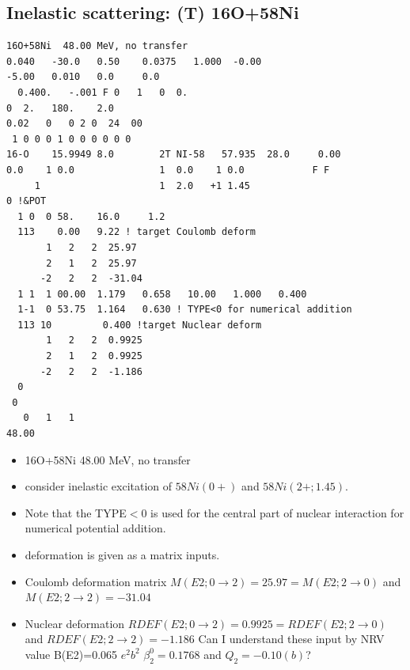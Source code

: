 \documentclass[11pt]{book}
\begin{document}
\subsection{Inelastic scattering: (T) 16O+58Ni}
\begin{small} 
\begin{lstlisting}[frame=single]
16O+58Ni  48.00 MeV, no transfer
0.040   -30.0   0.50    0.0375   1.000  -0.00
-5.00   0.010   0.0     0.0
  0.400.   -.001 F 0   1   0  0.
0  2.   180.    2.0
0.02   0   0 2 0  24  00
 1 0 0 0 1 0 0 0 0 0 0
16-O    15.9949 8.0        2T NI-58   57.935  28.0     0.00
0.0    1 0.0               1  0.0    1 0.0            F F
     1                     1  2.0   +1 1.45
0 !&POT
  1 0  0 58.    16.0     1.2
  113    0.00   9.22 ! target Coulomb deform
       1   2   2  25.97
       2   1   2  25.97
      -2   2   2  -31.04
  1 1  1 00.00  1.179   0.658   10.00   1.000   0.400
  1-1  0 53.75  1.164   0.630 ! TYPE<0 for numerical addition
  113 10         0.400 !target Nuclear deform
       1   2   2  0.9925
       2   1   2  0.9925
      -2   2   2  -1.186
  0
 0
   0   1   1
48.00
\end{lstlisting}
\end{small} 
\begin{itemize}
\item 16O+58Ni  48.00 MeV, no transfer
\item consider inelastic excitation of 
      $58Ni(0+)$ and  $58Ni(2+;1.45)$.
\item Note that the TYPE$<$0 is used for the central 
      part of nuclear interaction for
      numerical potential addition. 
\item deformation is given as a matrix inputs. 
\item Coulomb deformation matrix 
      $M(E2;0\to 2)=25.97=M(E2;2\to 0)$ 
      and $M(E2;2\to 2)=-31.04$          
\item  Nuclear deformation 
      $RDEF(E2;0\to 2)=0.9925=RDEF(E2;2\to 0)$    
      and $RDEF(E2;2\to 2)=-1.186$
     {\color{blue} Can I understand these input by 
      NRV value B(E2)=0.065 $e^2 b^2$ $\beta_2^0=0.1768$
         and $Q_2=-0.10 (b)$?}   
\end{itemize}
\end{document}
